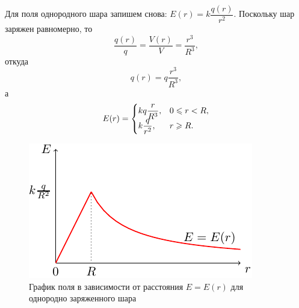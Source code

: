 	Для поля однородного шара запишем снова: $E(r)=k\dfrac{q(r)}{r^2}$. Поскольку шар заряжен равномерно, то
		$$\dfrac{q(r)}{q}=\frac{V(r)}{V}=\frac{r^3}{R^3},$$
	откуда
		$$q(r)=q\frac{r^3}{R^3},$$
	а
	\begin{equation}
		E(r)=\begin{cases}
					kq\dfrac{r}{R^3},& \text{$0\leqslant r<R$},\\
					k\dfrac{q}{r^2},& \text{$r\geqslant R$}.
				\end{cases}
	\end{equation}
	\begin{figure}
		\centering
		\includegraphics[scale=2]{./img/plot2/plot2.pdf}
		\caption{График поля в зависимости от расстояния $E=E(r)$ для однородно заряженного шара}
	\end{figure}